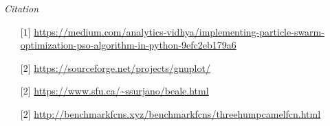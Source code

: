 \documentclass{article}
\begin{document}
\begin{center}
\begin{minipage}{33em}
\begin{enumerate}
   
\end{enumerate}
 \end{minipage}
\begin{center}
\begin{minipage}{33em}
\bigskip
\centering

\emph{\LARGE Citation}\\[2.5cm]

\noindent
\begin{enumerate}
    \item [$\lbrack 1 \rbrack$]\url{https://medium.com/analytics-vidhya/implementing-particle-swarm-optimization-pso-algorithm-in-python-9efc2eb179a6}
    \item [$\lbrack 2 \rbrack$]\url{https://sourceforge.net/projects/gnuplot/}
    \item [$\lbrack 2 \rbrack$]\url{https://www.sfu.ca/~ssurjano/beale.html}
    \item [$\lbrack 2 \rbrack$]\url{http://benchmarkfcns.xyz/benchmarkfcns/threehumpcamelfcn.html}
    
 
  
\end{enumerate}
\end{minipage}
 \end{center}
\end{center}
\end{document}
